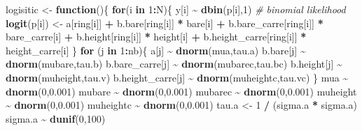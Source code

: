 \documentclass[
]{article}
\newenvironment{Shaded}{\begin{snugshade}}{\end{snugshade}}
\newcommand{\CommentTok}[1]{\textcolor[rgb]{0.56,0.35,0.01}{\textit{#1}}}
\newcommand{\ControlFlowTok}[1]{\textcolor[rgb]{0.13,0.29,0.53}{\textbf{#1}}}
\newcommand{\DecValTok}[1]{\textcolor[rgb]{0.00,0.00,0.81}{#1}}
\newcommand{\FloatTok}[1]{\textcolor[rgb]{0.00,0.00,0.81}{#1}}
\newcommand{\FunctionTok}[1]{\textcolor[rgb]{0.13,0.29,0.53}{\textbf{#1}}}
\newcommand{\NormalTok}[1]{#1}
\newcommand{\OtherTok}[1]{\textcolor[rgb]{0.56,0.35,0.01}{#1}}
\newcommand{\SpecialCharTok}[1]{\textcolor[rgb]{0.81,0.36,0.00}{\textbf{#1}}}
\begin{document}
\begin{Shaded}
\begin{Highlighting}[]
\NormalTok{logisitic }\OtherTok{\textless{}{-}} \ControlFlowTok{function}\NormalTok{()\{}
  \ControlFlowTok{for}\NormalTok{(i }\ControlFlowTok{in} \DecValTok{1}\SpecialCharTok{:}\NormalTok{N)\{}
\NormalTok{    y[i] }\SpecialCharTok{\textasciitilde{}} \FunctionTok{dbin}\NormalTok{(p[i],}\DecValTok{1}\NormalTok{) }\CommentTok{\# binomial likelihood}
    \FunctionTok{logit}\NormalTok{(p[i]) }\OtherTok{\textless{}{-}}\NormalTok{ a[ring[i]] }\SpecialCharTok{+}\NormalTok{ b.bare[ring[i]] }\SpecialCharTok{*}\NormalTok{ bare[i] }\SpecialCharTok{+}\NormalTok{ b.bare\_carre[ring[i]] }\SpecialCharTok{*}\NormalTok{ bare\_carre[i] }\SpecialCharTok{+}\NormalTok{ b.height[ring[i]] }\SpecialCharTok{*}\NormalTok{ height[i] }\SpecialCharTok{+}\NormalTok{ b.height\_carre[ring[i]] }\SpecialCharTok{*}\NormalTok{ height\_carre[i]}
\NormalTok{  \}}
  \ControlFlowTok{for}\NormalTok{ (j }\ControlFlowTok{in} \DecValTok{1}\SpecialCharTok{:}\NormalTok{nb)\{}
\NormalTok{    a[j] }\SpecialCharTok{\textasciitilde{}} \FunctionTok{dnorm}\NormalTok{(mua,tau.a) }
\NormalTok{    b.bare[j] }\SpecialCharTok{\textasciitilde{}} \FunctionTok{dnorm}\NormalTok{(mubare,tau.b)}
\NormalTok{    b.bare\_carre[j] }\SpecialCharTok{\textasciitilde{}} \FunctionTok{dnorm}\NormalTok{(mubarec,tau.bc)}
\NormalTok{    b.height[j] }\SpecialCharTok{\textasciitilde{}} \FunctionTok{dnorm}\NormalTok{(muheight,tau.v)}
\NormalTok{    b.height\_carre[j] }\SpecialCharTok{\textasciitilde{}} \FunctionTok{dnorm}\NormalTok{(muheightc,tau.vc) }
\NormalTok{  \}}
\NormalTok{mua }\SpecialCharTok{\textasciitilde{}} \FunctionTok{dnorm}\NormalTok{(}\DecValTok{0}\NormalTok{,}\FloatTok{0.001}\NormalTok{) }
\NormalTok{mubare }\SpecialCharTok{\textasciitilde{}} \FunctionTok{dnorm}\NormalTok{(}\DecValTok{0}\NormalTok{,}\FloatTok{0.001}\NormalTok{) }
\NormalTok{mubarec }\SpecialCharTok{\textasciitilde{}} \FunctionTok{dnorm}\NormalTok{(}\DecValTok{0}\NormalTok{,}\FloatTok{0.001}\NormalTok{) }
\NormalTok{muheight }\SpecialCharTok{\textasciitilde{}} \FunctionTok{dnorm}\NormalTok{(}\DecValTok{0}\NormalTok{,}\FloatTok{0.001}\NormalTok{)}
\NormalTok{muheightc }\SpecialCharTok{\textasciitilde{}} \FunctionTok{dnorm}\NormalTok{(}\DecValTok{0}\NormalTok{,}\FloatTok{0.001}\NormalTok{)}
\NormalTok{tau.a }\OtherTok{\textless{}{-}} \DecValTok{1} \SpecialCharTok{/}\NormalTok{ (sigma.a }\SpecialCharTok{*}\NormalTok{ sigma.a)}
\NormalTok{sigma.a }\SpecialCharTok{\textasciitilde{}} \FunctionTok{dunif}\NormalTok{(}\DecValTok{0}\NormalTok{,}\DecValTok{100}\NormalTok{)}

\end{Highlighting}
\end{Shaded}
\end{document}
